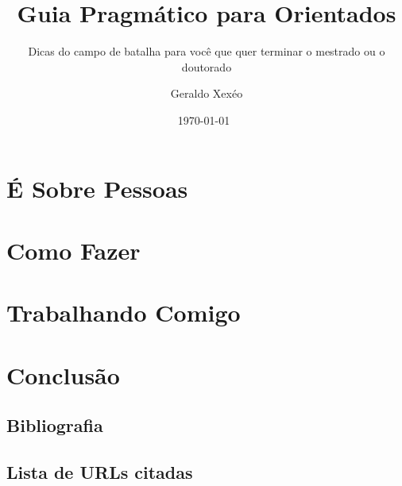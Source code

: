 \documentclass[fontsize=12pt,open=any,DIV=12,  BCOR=0mm,  headings=normal,   a4paper,pagesize=auto,toc=listof,twoside=false,chapterprefix=false,appendixprefix=true]{scrbook}
\title{Guia Pragmático para Orientados}
\subtitle{Dicas do campo de batalha para você que quer terminar o mestrado ou o doutorado}
\author{Geraldo Xexéo}
\date{\today~\currenttime}
\begin{document}


\clearpage
\maketitle






\pagestyle{plain}
\frontmatter
\tableofcontents
\listoffigures
\listoftables

\mainmatter
\pagestyle{headings}


\part{É Sobre Pessoas}







\part{Como Fazer}







%
\part{Trabalhando Comigo}



\part{Conclusão}

\chapter{Bibliografia}
\printbibliography[heading=none]  %
\printindex
\chapter{Lista de URLs citadas}
  \immediate\closeout\urllistfile
  \begin{itemize}
      
  \end{itemize}
\end{document}
